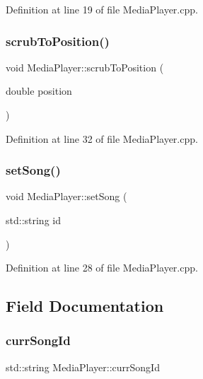 Definition at line 19 of file Media\+Player.\+cpp.

\mbox{\label{class_media_player_a2d0b6e0f85f3f8a87d0ff8de04b44cc7}} 
\subsubsection{\texorpdfstring{scrub\+To\+Position()}{scrubToPosition()}}
{\footnotesize\ttfamily void Media\+Player\+::scrub\+To\+Position (\begin{DoxyParamCaption}\item[{double}]{position }\end{DoxyParamCaption})}



Definition at line 32 of file Media\+Player.\+cpp.

\mbox{\label{class_media_player_a7c3d40399fc3b366a1f6324e8be1f4e5}} 
\subsubsection{\texorpdfstring{set\+Song()}{setSong()}}
{\footnotesize\ttfamily void Media\+Player\+::set\+Song (\begin{DoxyParamCaption}\item[{std\+::string}]{id }\end{DoxyParamCaption})}



Definition at line 28 of file Media\+Player.\+cpp.



\subsection{Field Documentation}
\mbox{\label{class_media_player_a28a6b20199f2c144a78b7e91a6b65bf2}} 
\subsubsection{\texorpdfstring{curr\+Song\+Id}{currSongId}}
{\footnotesize\ttfamily std\+::string Media\+Player\+::curr\+Song\+Id\hspace{0.3cm}{\ttfamily [private]}}



